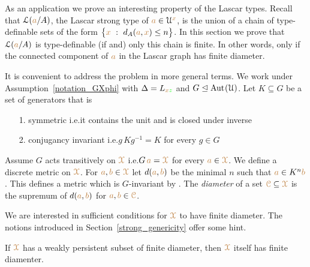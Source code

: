 As an application we prove an interesting property of the Lascar types.
Recall that $\EuScript L({\color{brown} a}/A)$, the Lascar strong type of ${\color{brown} a}\in\EuScript U^{\color{brown} x}$, is the union of a chain of type-definable sets of the form $\big\{{\color{brown} x}\ :\ d_A({\color{brown} a},{\color{brown} x})\le n\big\}$.
In this section we prove that $\EuScript L({\color{brown} a}/A)$ is type-definable (if and) only this chain is finite.
In other words, only if the connected component of ${\color{brown} a}$ in the Lascar graph has finite diameter.

It is convenient to address the problem in more general terms.
We work under Assumption~\ref{notation_GXphi} with $\Delta=L_{{\color{brown} x}{\color{green} z}}$ and $G\trianglelefteq{\rm Aut\kern.15ex}(\EuScript U)$.
Let $K\subseteq G$ be a set of generators that is
\begin{itemize}
  \item[1.] symmetric i.e.\@ it contains the unit and is closed under inverse
  \item[2.] conjugancy invariant i.e.\@ $g\,Kg^{-1}=K$ for every $g\in G$
\end{itemize}

Assume $G$ acts transitively on ${\color{brown}\EuScript X}$ i.e.\@ $G\,{\color{brown} a}={\color{brown}\EuScript X}$ for every ${\color{brown} a}\in{\color{brown}\EuScript X}$.
We define a discrete metric on ${\color{brown}\EuScript X}$.
For ${\color{brown} a},{\color{brown} b}\in{\color{brown}\EuScript X}$ let $d({\color{brown} a},{\color{brown} b})$ be the minimal $n$ such that ${\color{brown} a}\in K^n{\color{brown} b}$.
This defines a metric which is $G$-invariant by .
The \emph{diameter\/} of a set ${\color{brown}\EuScript C}\subseteq{\color{brown}\EuScript X}$ is the supremum of $d({\color{brown} a},{\color{brown} b})$ for ${\color{brown} a},{\color{brown} b}\in{\color{brown}\EuScript C}$.

We are interested in sufficient conditions for ${\color{brown}\EuScript X}$ to have finite diameter.
The notions introduced in Section~\ref{strong_genericity} offer some hint.

\begin{proposition}\label{prop_wpers_finite_diameter}
  If ${\color{brown}\EuScript X}$ has a weakly persistent subset of finite diameter, then ${\color{brown}\EuScript X}$ itself has finite diamenter.
\end{proposition}

